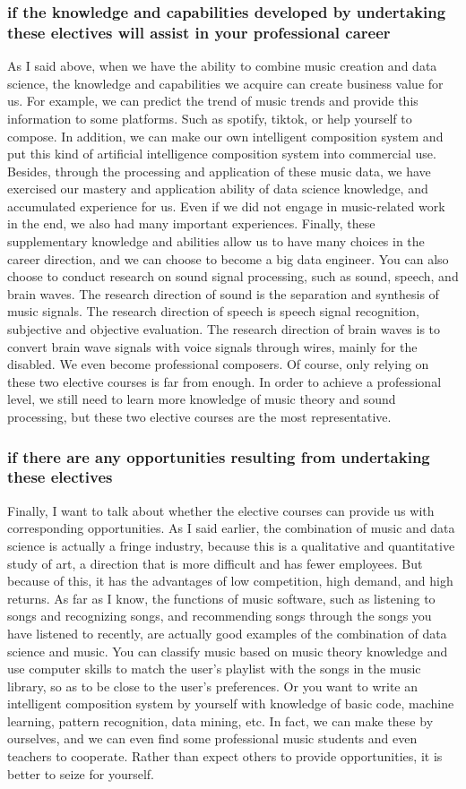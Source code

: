 \documentclass[../draft.tex]{subfiles}
\begin{document}
\subsubsection{if the knowledge and capabilities developed by undertaking these electives will assist in your professional career}
As I said above, when we have the ability to combine music creation and data science, the knowledge and capabilities we acquire can create business value for us. For example, we can predict the trend of music trends and provide this information to some platforms. Such as spotify, tiktok, or help yourself to compose. In addition, we can make our own intelligent composition system and put this kind of artificial intelligence composition system into commercial use. Besides, through the processing and application of these music data, we have exercised our mastery and application ability of data science knowledge, and accumulated experience for us. Even if we did not engage in music-related work in the end, we also had many important experiences. Finally, these supplementary knowledge and abilities allow us to have many choices in the career direction, and we can choose to become a big data engineer. You can also choose to conduct research on sound signal processing, such as sound, speech, and brain waves. The research direction of sound is the separation and synthesis of music signals. The research direction of speech is speech signal recognition, subjective and objective evaluation. The research direction of brain waves is to convert brain wave signals with voice signals through wires, mainly for the disabled. We even become professional composers. Of course, only relying on these two elective courses is far from enough. In order to achieve a professional level, we still need to learn more knowledge of music theory and sound processing, but these two elective courses are the most representative.
\subsubsection{if there are any opportunities resulting from undertaking these electives}
Finally, I want to talk about whether the elective courses can provide us with corresponding opportunities. As I said earlier, the combination of music and data science is actually a fringe industry, because this is a qualitative and quantitative study of art, a direction that is more difficult and has fewer employees. But because of this, it has the advantages of low competition, high demand, and high returns. As far as I know, the functions of music software, such as listening to songs and recognizing songs, and recommending songs through the songs you have listened to recently, are actually good examples of the combination of data science and music. You can classify music based on music theory knowledge and use computer skills to match the user’s playlist with the songs in the music library, so as to be close to the user’s preferences. Or you want to write an intelligent composition system by yourself with knowledge of basic code, machine learning, pattern recognition, data mining, etc. In fact, we can make these by ourselves, and we can even find some professional music students and even teachers to cooperate. Rather than expect others to provide opportunities, it is better to seize for yourself.
\end{document}
